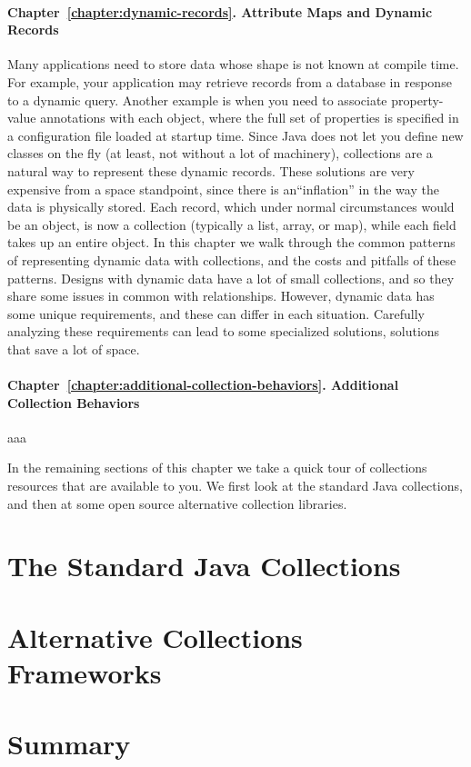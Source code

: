 \paragraph{Chapter~\ref{chapter:dynamic-records}. Attribute Maps and Dynamic
Records} Many applications need to store data whose shape is not
known at compile time. For example, your application may retrieve
records from a database in response to a dynamic query. Another example is when
you need to associate property-value annotations with each object, where the full set of
properties is specified in a configuration
file loaded at startup time.
Since Java does not let you define new classes on the fly (at
least, not without a lot of machinery), collections are a natural way to
represent these dynamic records. These solutions are very expensive from a
space standpoint, since there is an``inflation'' in the way the data is
physically stored. Each record, which under normal circumstances would be an
object, is now a collection (typically a list, array, or map), while each
field takes up an entire object.
In this chapter we walk through the
common patterns of representing dynamic data with collections, and
the costs and pitfalls of these patterns. Designs with dynamic data 
have a lot of small collections, and so they share some issues in
common with relationships. However, dynamic data has some unique requirements, and
these can differ in each situation. Carefully analyzing these
requirements can lead to some specialized solutions, solutions that save a lot
of space.

\paragraph{Chapter~\ref{chapter:additional-collection-behaviors}. Additional
Collection Behaviors} aaa

In the remaining sections of this chapter we take a quick tour of collections
resources that are available to you.  We first look at the standard Java
collections, and then at some open source alternative collection
libraries.

\section{The Standard Java Collections}

\section{Alternative Collections Frameworks}


\section{Summary}


